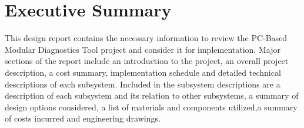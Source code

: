 \section*{Executive Summary}
This design report contains the necessary information to review the PC-Based Modular 
Diagnostics Tool project and consider it for implementation. Major sections of the
report include an introduction to the project, an overall project description,
a cost summary, implementation schedule and detailed technical descriptions of each
subsystem. Included in the subsystem descriptions are a description of each subsystem
and its relation to other subsystems, a summary of design options considered, a list 
of materials and components utilized,a summary of costs incurred and engineering drawings.
